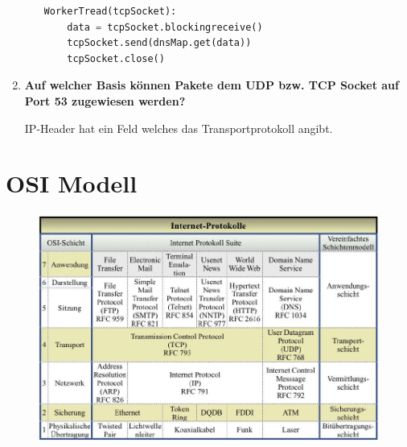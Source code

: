 \documentclass{article}
\begin{document}
\begin{enumerate}
\begin{itemize}
\begin{lstlisting}[language=Python]
WorkerTread(tcpSocket):
	data = tcpSocket.blockingreceive()
	tcpSocket.send(dnsMap.get(data))
	tcpSocket.close()
		\end{lstlisting}
	\end{itemize}
	
	\item \textbf{Auf welcher Basis können Pakete dem UDP bzw. TCP Socket auf Port 53 zugewiesen werden?}
	\begin{flushleft}
		IP-Header hat ein Feld welches das Transportprotokoll angibt.
	\end{flushleft}
	
\end{enumerate}

\section{OSI Modell}
\begin{figure}[!ht]
	\centering
	\includegraphics[scale=0.5]{media/OSI-Modell}
\end{figure}
\end{document}
